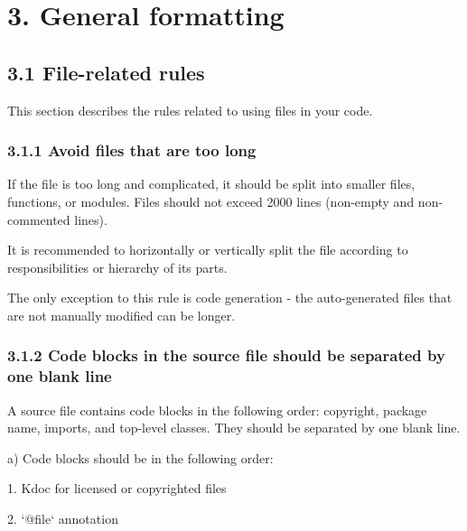 \section*{\textbf{3. General formatting}}

\label{sec:3.}

\subsection*{\textbf{3.1 File-related rules}}

\label{sec:3.1}

This section describes the rules related to using files in your code.

\subsubsection*{\textbf{3.1.1 Avoid files that are too long}}
\leavevmode\newline

\label{sec:3.1.1}



If the file is too long and complicated, it should be split into smaller files, functions, or modules. Files should not exceed 2000 lines (non-empty and non-commented lines).

It is recommended to horizontally or vertically split the file according to responsibilities or hierarchy of its parts.

The only exception to this rule is code generation - the auto-generated files that are not manually modified can be longer.



\subsubsection*{\textbf{3.1.2 Code blocks in the source file should be separated by one blank line}}
\leavevmode\newline

\label{sec:3.1.2}

A source file contains code blocks in the following order: copyright, package name, imports, and top-level classes. They should be separated by one blank line.



a) Code blocks should be in the following order:

1.	Kdoc for licensed or copyrighted files

2.	`@file` annotation


